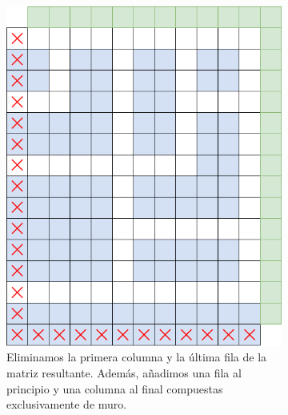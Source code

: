 \begin{figure}[H]
\begin{subfigure}[b]{0.45\textwidth}
            \includegraphics[scale=0.375]{img/paso11.png}
            \caption{Eliminamos la primera columna y la última fila de la matriz resultante. Además, añadimos una fila al principio y una columna al final compuestas exclusivamente de muro.}
        \end{subfigure}
        \hfill\begin{subfigure}[b]{0.45\textwidth}
            \centering

\end{subfigure}
\end{figure}
